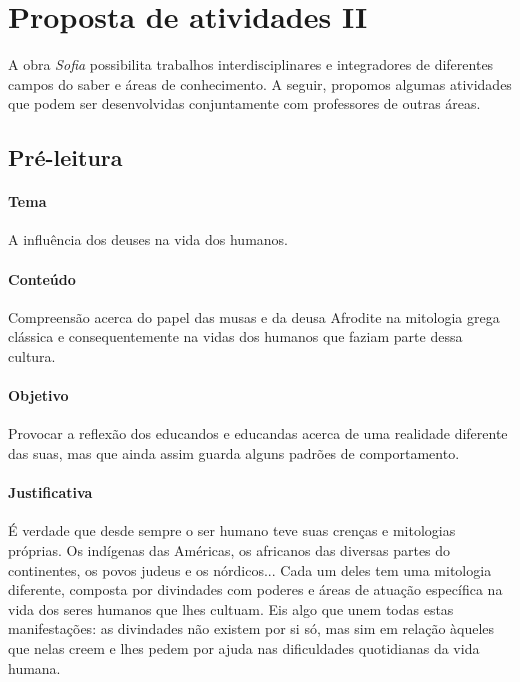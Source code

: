 \documentclass[12pt]{extarticle}
\begin{document}
\pagebreak\section{Proposta de atividades II}


A obra \emph{\textit{Sofia}} possibilita trabalhos interdisciplinares e integradores de
diferentes campos do saber e áreas de conhecimento. A seguir, propomos algumas
atividades que podem ser desenvolvidas conjuntamente com professores de outras
áreas. %


\subsection{Pré-leitura} 

\paragraph{Tema} A influência dos deuses na vida dos humanos.

\paragraph{Conteúdo} Compreensão acerca do papel das musas e da deusa Afrodite
na mitologia grega clássica e consequentemente na vidas dos humanos que faziam parte dessa cultura.

\paragraph{Objetivo} Provocar a reflexão dos educandos e educandas acerca de
uma realidade diferente das suas, mas que ainda assim guarda alguns padrões 
de comportamento. 

\paragraph{Justificativa} É verdade que desde sempre o ser humano teve suas
crenças e mitologias próprias. Os indígenas das Américas, os africanos das diversas
partes do continentes, os povos judeus e os nórdicos... Cada um deles tem uma
mitologia diferente, composta por divindades com poderes e áreas de atuação
específica na vida dos seres humanos que lhes cultuam. Eis algo que unem todas
estas manifestações: as divindades não existem por si só, mas sim em relação 
àqueles que nelas creem e lhes pedem por ajuda nas dificuldades quotidianas da vida
humana. 
\end{document}
